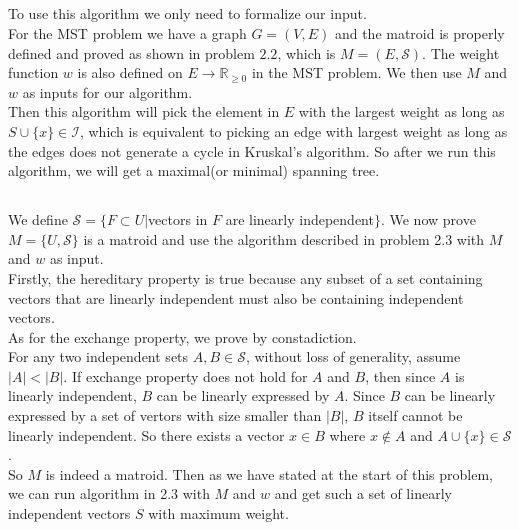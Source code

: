 \documentclass[12pt,letterpaper]{article}
\begin{document}
\subsection{}
To use this algorithm we only need to formalize our input.\\
For the MST problem we have a graph $G=(V,E)$ and the matroid is properly defined and proved as shown in problem $2.2$,
which is $M=(E,\mathcal{S})$. 
The weight function $w$ is also defined on $E\to \mathbb{R}_{\geq 0}$ in the MST problem.
We then use $M$ and $w$ as inputs for our algorithm.\\
Then this algorithm will pick the element in $E$ with the largest weight as long as $S\cup \{x\}\in\mathcal{I}$,
which is equivalent to picking an edge with largest weight as long as the edges does not generate a cycle in Kruskal's algorithm.
So after we run this algorithm, we will get a maximal(or minimal) spanning tree.

\subsection{}
We define $\mathcal{S}=\{F\subset U|$vectors in $F$ are linearly independent$\}$.
We now prove $M=\{U,\mathcal{S}\}$ is a matroid and use the algorithm described in problem 2.3 with $M$ and $w$ as input.\\
Firstly, the hereditary property is true because any subset of a set containing vectors that are linearly independent must also be containing independent vectors.\\
As for the  exchange property, we prove by constadiction.\\
For any two independent sets $A,B\in\mathcal{S}$, without loss of generality, assume $|A|<|B|$.
If exchange property does not hold for $A$ and $B$, then since $A$ is linearly independent,
$B$ can be linearly expressed by $A$.
Since $B$ can be linearly expressed by a set of vertors with size smaller than $|B|$,
$B$ itself cannot be linearly independent.
So there exists a vector $x\in B$ where $x\notin A$ and $A\cup\{x\}\in\mathcal{S}$.\\
So $M$ is indeed a matroid. Then as we have stated at the start of this problem,
we can run algorithm in 2.3 with $M$ and $w$ and get such a set of linearly independent vectors $S$ with maximum weight.

\newpage
\section{}
\end{document}
